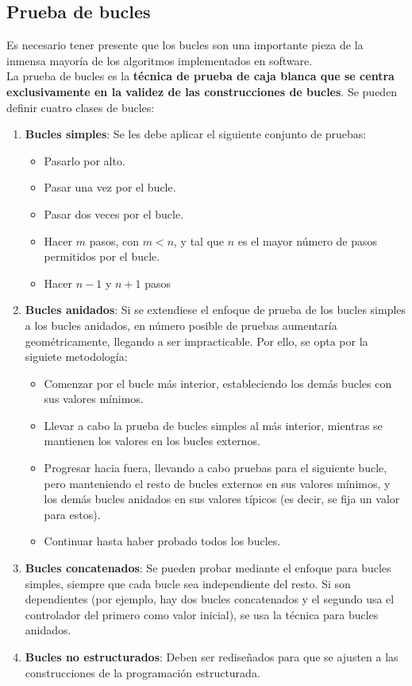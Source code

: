 \subsection{Prueba de bucles}

Es necesario tener presente que los bucles son una importante pieza de la inmensa mayoría de los algoritmos implementados en software.\\

La prueba de bucles es la \textbf{técnica de prueba de caja blanca que se centra exclusivamente en la validez de las construcciones de bucles}. Se pueden definir cuatro clases de bucles:

\begin{enumerate}
    \item \textbf{Bucles simples}: Se les debe aplicar el siguiente conjunto de pruebas:
          \begin{itemize}
              \item Pasarlo por alto.
              \item Pasar una vez por el bucle.
              \item Pasar dos veces por el bucle.
              \item Hacer $m$ pasos, con $m < n$, y tal que $n$ es el mayor número de pasos permitidos por el bucle.
              \item Hacer $n-1$ y $n+1$ pasos
          \end{itemize}

    \item \textbf{Bucles anidados}: Si se extendiese el enfoque de prueba de los bucles simples a los bucles anidados, en número posible de pruebas aumentaría geométricamente, llegando a ser impracticable. Por ello, se opta por la siguiete metodología:
          \begin{itemize}
              \item Comenzar por el bucle más interior, estableciendo los demás bucles con sus valores mínimos.
              \item Llevar a cabo la prueba de bucles simples al más interior, mientras se mantienen los valores en los bucles externos.
              \item Progresar hacia fuera, llevando a cabo pruebas para el siguiente bucle, pero manteniendo el resto de bucles externos en sus valores mínimos, y los demás bucles anidados en sus valores típicos (es decir, se fija un valor para estos).
              \item Continuar hasta haber probado todos los bucles.
          \end{itemize}
    \item \textbf{Bucles concatenados}: Se pueden probar mediante el enfoque para bucles simples, siempre que cada bucle sea independiente del resto. Si son dependientes (por ejemplo, hay dos bucles concatenados y el segundo usa el controlador del primero como valor inicial), se usa la técnica para bucles anidados.
    \item \textbf{Bucles no estructurados}: Deben ser rediseñados para que se ajusten a las construcciones de la programación estructurada.
\end{enumerate}

